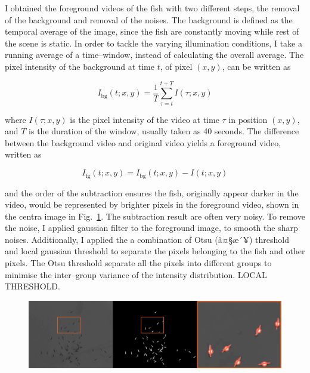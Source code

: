 \documentclass[11pt,twoside]{report}
\begin{document}
I obtained the foreground videos of the fish with two different steps, the removal of the background and removal of the noises. The background is defined as the temporal average of the image, since the fish are constantly moving while rest of the scene is static. In order to tackle the varying illumination conditions, I take a running average of a time--window, instead of calculating the overall average. The pixel intensity of the background at time $t$, of pixel $(x, y)$, can be written as

\begin{equation}
I_\mathrm{bg}(t; x, y) = \frac{1}{T} \sum_{\tau=t}^{t+T}{I(\tau; x, y)}
\label{eqBG}
\end{equation}

\noindent where $I(\tau; x, y)$ is the pixel intensity of the video at time $\tau$ in position $(x, y)$, and $T$ is the duration of the window, usually taken as 40 seconds. The difference between the background video and original video yields a foreground video, written as

\begin{equation}
	I_\mathrm{fg}(t; x, y) = I_\mathrm{bg}(t; x, y) - I(t; x, y)
\label{eqFG}
\end{equation}

\noindent and the order of the subtraction ensures the fish, originally appear darker in the video, would be represented by brighter pixels in the foreground video, shown in the centra image in Fig.\ \ref{fig:2d_process}. The subtraction result are often very noisy. To remove the noise, I applied gaussian filter to the foreground image, to smooth the sharp noises. Additionally, I applied the a combination of Otsu (å¤§æ´¥) threshold and local gaussian threshold to separate the pixels belonging to the fish and other pixels. The Otsu threshold separate all the pixels into different groups to minimise the inter--group variance of the intensity distribution. LOCAL THRESHOLD.

\begin{figure}
  \includegraphics[width=\linewidth,outer]{2d-processing.png}
  \caption{}
  \label{fig:2d_process}
\end{figure}
\end{document}
